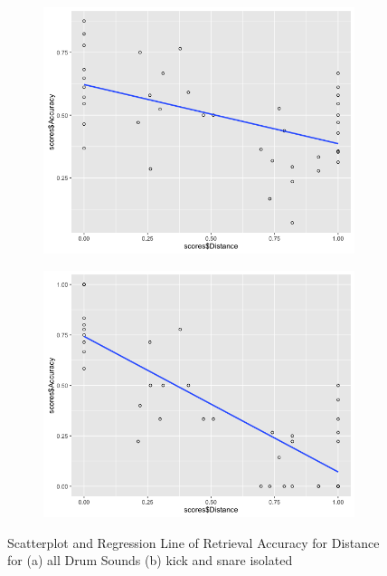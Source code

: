 \begin{figure}
\centering
\begin{subfigure}[b]{0.75\textwidth}
   \includegraphics[width=1\linewidth]{ch07_evaluation/figures/overall_correlation.png}
   \caption{}
   \label{fig:corr1} 
\end{subfigure}

\begin{subfigure}[b]{0.75\textwidth}
   \includegraphics[width=1\linewidth]{ch07_evaluation/figures/kick_snare_correlation.png}
   \caption{}
   \label{fig:corr2}
\end{subfigure}

\caption[Scatterplot and Regression Lines of Retrieval Accuracy]{Scatterplot and Regression Line of Retrieval Accuracy for Distance for (a) all Drum Sounds (b) kick and snare isolated}
\end{figure}

